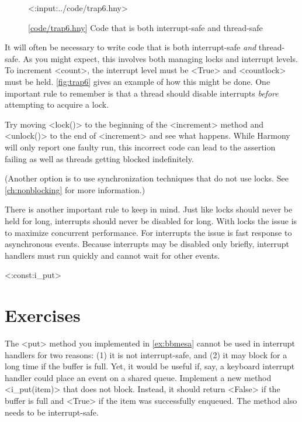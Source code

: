 \documentclass{report}
\newcommand{\harmonylink}[1]{%
[\href{https://harmony.cs.cornell.edu/#1}{\underline{#1}}]%
}
\newenvironment{code}{
\tcolorbox
}{
\endtcolorbox
}
\begin{document}
\begin{figure}
\begin{code}
<{:input:../code/trap6.hny}>
\end{code}
\caption{\harmonylink{code/trap6.hny} Code that is both interrupt-safe and thread-safe}
\label{fig:trap6}
\end{figure}

It will often be necessary to write code that is both interrupt-safe \emph{and}
thread-safe.  As you might expect, this involves both managing locks and
interrupt levels.
To increment <{count}>, the interrupt level must be <{True}> and
<{countlock}> must be held.
\autoref{fig:trap6} gives an example of how this might be done.
One important rule to remember is that a thread should disable interrupts \emph{before}
attempting to acquire a lock.

Try moving <{lock()}> to the beginning of the <{increment}> method
and <{unlock()}> to the end of <{increment}> and see what happens.
While Harmony will only report one faulty run, this incorrect code can lead to
the assertion failing as well as threads getting blocked indefinitely.

(Another option is to use synchronization techniques that do not use locks.
See \autoref{ch:nonblocking} for more information.)

There is another important rule to keep in mind.  Just like locks should never be held
for long, interrupts should never be disabled for long.  With locks the issue is to
maximize concurrent performance.  For interrupts the issue is fast response to
asynchronous events.  Because interrupts may be disabled only briefly, interrupt
handlers must run quickly and cannot wait for other events.

<{:const:i_put}>

\section*{Exercises}
\begin{problems}
\item The <{put}> method you implemented in \autoref{ex:bbmesa} cannot be used
in interrupt handlers for two reasons: (1) it is not interrupt-safe, and (2)
it may block for a long time if the buffer is full.  Yet, it would be useful if,
say, a keyboard interrupt handler could place an event on a shared queue.
Implement a new method <{i_put(item)}> that does not
block.  Instead, it should return <{False}> if the buffer is full and <{True}>
if the item was successfully enqueued.
The method also needs to be interrupt-safe.
\end{problems}
\end{document}
